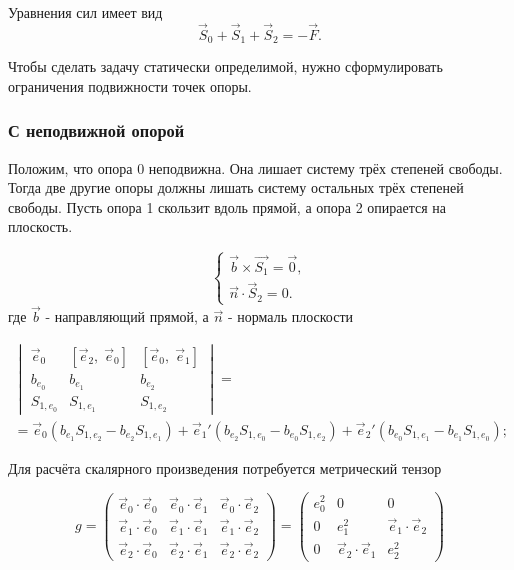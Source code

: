 Уравнения сил имеет вид
\begin{equation*}
\vec{S}_0 + \vec S_1 + \vec S_2 = -\vec{F}.
\end{equation*}

Чтобы сделать задачу статически определимой, нужно сформулировать ограничения подвижности точек опоры.

\subsubsection{С неподвижной опорой}

Положим, что опора 0 неподвижна. Она лишает систему трёх степеней свободы.\\
Тогда две другие опоры должны лишать систему остальных трёх степеней свободы.
Пусть опора 1 скользит вдоль прямой, а опора 2 опирается на плоскость.


\begin{equation}
\left\{\begin{array}{l}
	\vec{b}\times\vec{S_1} = \vec{0},\\
	\vec n \cdot \vec S_2 = 0.
\end{array}\right.
\end{equation}
где $\vec{b}$ - направляющий прямой, а $\vec n$ - нормаль плоскости

\begin{multline*}
\begin{vmatrix} 
\vec e_0 &  [ \vec e_2,\; \vec e_0 ] & [ \vec e_0,\; \vec e_1 ] \\ 
b_{e_0} & b_{e_1} & b_{e_2} \\ 
S_{1,{e_0}} & S_{1,{e_1}} & S_{1,{e_2}}
\end{vmatrix} 
= \\ =
\vec e_0 \left( b_{e_1} S_{1,{e_2}} - b_{e_2} S_{1,{e_1}} \right)
+ \vec e_1' \left( b_{e_2} S_{1,{e_0}} - b_{e_0} S_{1,{e_2}} \right)
+ \vec e_2' \left( b_{e_0} S_{1,{e_1}} - b_{e_1} S_{1,{e_0}} \right);
\end{multline*}

Для расчёта скалярного произведения потребуется метрический тензор

\begin{equation}
g = 
\begin{pmatrix}
	\vec e_0 \cdot \vec e_0 & \vec e_0 \cdot \vec e_1 & \vec e_0 \cdot \vec e_2 \\
	\vec e_1 \cdot \vec e_0 & \vec e_1 \cdot \vec e_1 & \vec e_1 \cdot \vec e_2 \\
	\vec e_2 \cdot \vec e_0 & \vec e_2 \cdot \vec e_1 & \vec e_2 \cdot \vec e_2
\end{pmatrix}
=
\begin{pmatrix}
	e_0^2 & 0 & 0 \\
	0 & e_1^2 & \vec e_1 \cdot \vec e_2 \\
	0 & \vec e_2 \cdot \vec e_1 & e_2^2
\end{pmatrix}
\end{equation}

